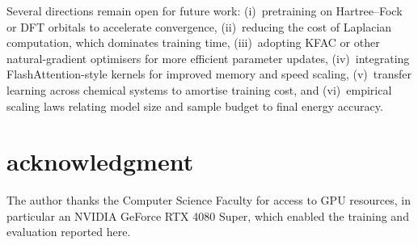 Several directions remain open for future work: (i)~pretraining on Hartree--Fock or DFT orbitals to accelerate convergence, (ii)~reducing the cost of Laplacian computation, which dominates training time, (iii)~adopting KFAC or other natural-gradient optimisers for more efficient parameter updates, (iv)~integrating FlashAttention-style kernels for improved memory and speed scaling, (v)~transfer learning across chemical systems to amortise training cost, and (vi)~empirical scaling laws relating model size and sample budget to final energy accuracy.

\section*{acknowledgment}
The author thanks the Computer Science Faculty for access to GPU resources, in particular an NVIDIA GeForce RTX 4080 Super, which enabled the training and evaluation reported here.

